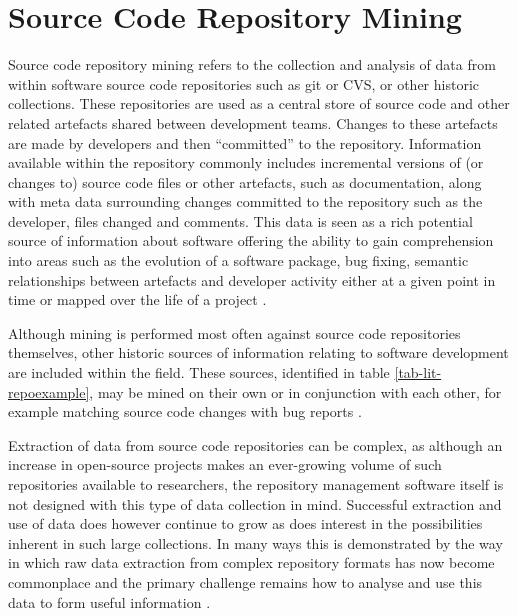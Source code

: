 \section{Source Code Repository Mining}\label{lit-repomining}

Source code repository mining refers to the collection and analysis of data from within software source code repositories such as git or CVS, or other historic collections. These repositories are used as a central store of source code and other related artefacts shared between development teams. Changes to these artefacts are made by developers and then ``committed'' to the repository. Information available within the repository commonly includes incremental versions of (or changes to) source code files or other artefacts, such as documentation, along with meta data surrounding changes committed to the repository such as the developer, files changed and comments. This data is seen as a rich potential source of information about software offering the ability to gain comprehension into areas such as the evolution of a software package, bug fixing, semantic relationships between artefacts and developer activity either at a given point in time or mapped over the life of a project \citep{kagdi_survey_2007,allamanis_mining_2013,williams_automatic_2005}.

Although mining is performed most often against source code repositories themselves, other historic sources of information relating to software development are included within the field. These sources, identified in table \ref{tab-lit-repoexample}, may be mined on their own or in conjunction with each other, for example matching source code changes with bug reports \citep{williams_automatic_2005,hassan_road_2008}.

Extraction of data from source code repositories can be complex, as although an increase in open-source projects makes an ever-growing volume of such repositories available to researchers, the repository management software itself is not designed with this type of data collection in mind. Successful extraction and use of data does however continue to grow as does interest in the possibilities inherent in such large collections. In many ways this is demonstrated by the way in which raw data extraction from complex repository formats has now become commonplace and the primary challenge remains how to analyse and use this data to form useful information \citep{hassan_road_2008}.

